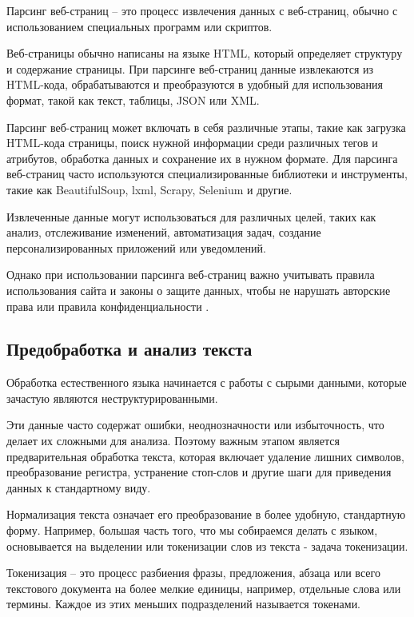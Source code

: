 \documentclass[coursework]{SCWorks}
\begin{document}
    Парсинг веб-страниц – это процесс извлечения данных с веб-страниц, обычно с использованием специальных программ или скриптов.

    Веб-страницы обычно написаны на языке HTML, который определяет структуру и содержание страницы.
    При парсинге веб-страниц данные извлекаются из HTML-кода, обрабатываются и преобразуются в удобный для использования формат,
    такой как текст, таблицы, JSON или XML.

    Парсинг веб-страниц может включать в себя различные этапы, такие как загрузка HTML-кода страницы, поиск нужной информации среди различных тегов и атрибутов, обработка данных и сохранение их в нужном формате.
    Для парсинга веб-страниц часто используются специализированные библиотеки и инструменты, такие как BeautifulSoup, lxml, Scrapy, Selenium и другие.

    Извлеченные данные могут использоваться для различных целей, таких как анализ, отслеживание изменений, автоматизация задач,
    создание персонализированных приложений или уведомлений.

    Однако при использовании парсинга веб-страниц важно учитывать правила использования сайта и законы о защите данных, чтобы не нарушать авторские права или правила конфиденциальности \cite{bokovikov2024weather}.

    \subsection{Предобработка и анализ текста}
    Обработка естественного языка начинается с работы с сырыми данными, которые зачастую являются неструктурированными.

    Эти данные часто содержат ошибки, неоднозначности или избыточность, что делает их сложными для анализа.
    Поэтому важным этапом является предварительная обработка текста, которая включает удаление лишних символов,
    преобразование регистра, устранение стоп-слов и другие шаги для приведения данных к стандартному виду.

    Нормализация текста означает его преобразование в более удобную, стандартную форму.
    Например, большая часть того, что мы собираемся делать с языком,
    основывается на выделении или токенизации слов из текста - задача токенизации\cite{JurafskyMartin}.

    Токенизация – это процесс разбиения фразы, предложения, абзаца или всего текстового документа на более мелкие единицы,
    например, отдельные слова или термины.
    Каждое из этих меньших подразделений называется токенами.
\end{document}
